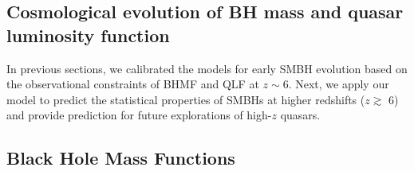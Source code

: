 \documentclass[twocolumn, twocolappendix]{aastex63}
\begin{document}
\begin{CJK*}{UTF8}{gbsn}
\vspace{2mm}
\section{Cosmological evolution of BH mass and quasar luminosity function}\label{sec:cosm}


In previous sections, we calibrated the models for early SMBH evolution based on the observational constraints of BHMF and QLF at $z\sim6$.
Next, we apply our model to predict the statistical properties of SMBHs at higher redshifts ($z\gtrsim$ 6)
and provide prediction for future explorations of high-$z$ quasars.

\subsection{Black Hole Mass Functions}



\end{CJK*}
\end{document}
